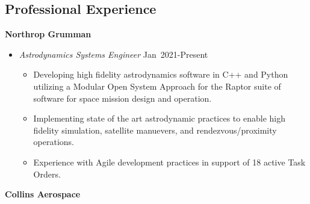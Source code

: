 \subsection*{Professional Experience}
{}

\textbf{Northrop Grumman}

\begin{itemize}
    \item[] \textit{Astrodynamics Systems Engineer} \hfill {Jan~2021-Present}
        \begin{itemize}
            \item Developing high fidelity astrodynamics software in C++ and Python utilizing a Modular Open System Approach for the Raptor suite of software for space mission design and operation. 
            \item Implementing state of the art astrodynamic practices to enable high fidelity simulation, satellite manuevers, and rendezvous/proximity operations. 
            \item Experience with Agile development practices in support of 18 active Task Orders. 
        \end{itemize}
\end{itemize}
\textbf{Collins Aerospace}

